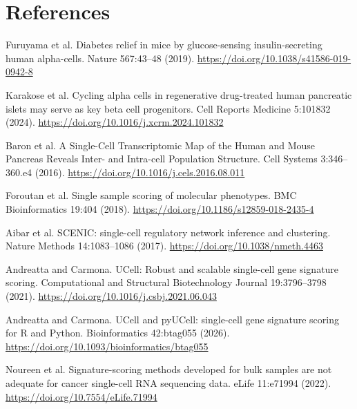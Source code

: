 \documentclass[11pt,letterpaper]{article}
\begin{document}
\section*{References}\small
\begin{samepage}[1] Furuyama et al. Diabetes relief in mice by glucose-sensing insulin-secreting human alpha-cells. Nature 567:43–48 (2019). \url{https://doi.org/10.1038/s41586-019-0942-8}\par\end{samepage}
\begin{samepage}[2] Karakose et al. Cycling alpha cells in regenerative drug-treated human pancreatic islets may serve as key beta cell progenitors. Cell Reports Medicine 5:101832 (2024). \url{https://doi.org/10.1016/j.xcrm.2024.101832}\par\end{samepage}
\begin{samepage}[3] Baron et al. A Single-Cell Transcriptomic Map of the Human and Mouse Pancreas Reveals Inter- and Intra-cell Population Structure. Cell Systems 3:346–360.e4 (2016). \url{https://doi.org/10.1016/j.cels.2016.08.011}\par\end{samepage}
\begin{samepage}[4] Foroutan et al. Single sample scoring of molecular phenotypes. BMC Bioinformatics 19:404 (2018). \url{https://doi.org/10.1186/s12859-018-2435-4}\par\end{samepage}
\begin{samepage}[5] Aibar et al. SCENIC: single-cell regulatory network inference and clustering. Nature Methods 14:1083–1086 (2017). \url{https://doi.org/10.1038/nmeth.4463}\par\end{samepage}
\begin{samepage}[6] Andreatta and Carmona. UCell: Robust and scalable single-cell gene signature scoring. Computational and Structural Biotechnology Journal 19:3796–3798 (2021). \url{https://doi.org/10.1016/j.csbj.2021.06.043}\par\end{samepage}
\begin{samepage}[7] Andreatta and Carmona. UCell and pyUCell: single-cell gene signature scoring for R and Python. Bioinformatics 42:btag055 (2026). \url{https://doi.org/10.1093/bioinformatics/btag055}\par\end{samepage}
\begin{samepage}[8] Noureen et al. Signature-scoring methods developed for bulk samples are not adequate for cancer single-cell RNA sequencing data. eLife 11:e71994 (2022). \url{https://doi.org/10.7554/eLife.71994}\par\end{samepage}
\end{document}

